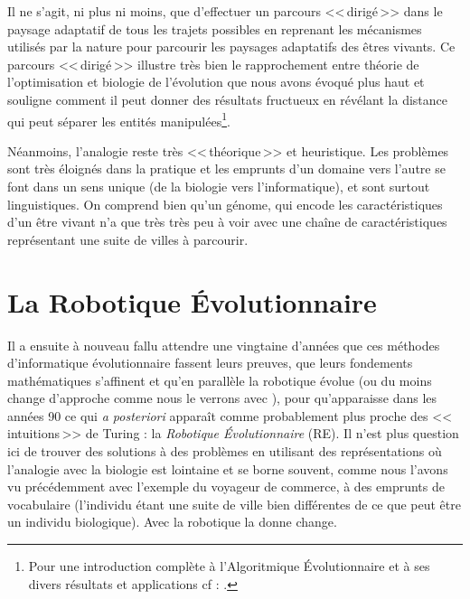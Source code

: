 Il ne s'agit, ni plus ni moins, que d'effectuer un parcours <<\,dirigé\,>> dans le paysage adaptatif de tous les trajets possibles en reprenant les mécanismes utilisés par la nature pour parcourir les paysages adaptatifs des êtres vivants.
Ce parcours <<\,dirigé\,>> illustre très bien le rapprochement entre théorie de l'optimisation et biologie de l'évolution que nous avons évoqué plus haut et souligne comment il peut donner des résultats fructueux en révélant la distance qui peut séparer les entités manipulées\footnote{Pour une introduction complète à l'Algoritmique Évolutionnaire et à ses divers résultats et applications cf : \citet{eiben03introductiontoevolutionarycomputing}.}.

Néanmoins, l'analogie reste très <<\,théorique\,>> et heuristique. Les problèmes sont très éloignés dans la pratique et les emprunts d'un domaine vers l'autre se font dans un sens unique (de la biologie vers l'informatique), et sont surtout linguistiques. On comprend bien qu'un génome, qui encode les caractéristiques d'un être vivant n'a que très très peu à voir avec une chaîne de caractéristiques représentant une suite de villes à parcourir.

\section*{La Robotique \'Evolutionnaire} \label{sec:intro:re}
Il a ensuite à nouveau fallu attendre une vingtaine d'années que ces méthodes d'informatique évolutionnaire fassent leurs preuves, que leurs fondements mathématiques s'affinent et qu'en parallèle la robotique évolue (ou du moins change d'approche comme nous le verrons avec \citet{brooks91intelligencewithoutreason}), pour qu'apparaisse dans les années 90 ce qui \emph{a posteriori} apparaît comme probablement plus proche des <<\,intuitions\,>> de Turing : la \emph{Robotique \'Evolutionnaire} (RE). Il n'est plus question ici de trouver des solutions à des problèmes en utilisant des représentations où l'analogie avec la biologie est lointaine et se borne souvent, comme nous l'avons vu précédemment avec l'exemple du voyageur de commerce, à des emprunts de vocabulaire (l'individu étant une suite de ville bien différentes de ce que peut être un individu biologique). Avec la robotique la donne change.

